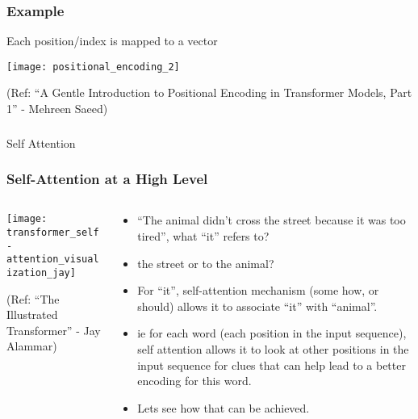 \begin{frame}[fragile]\frametitle{Example}

Each position/index is mapped to a vector

\begin{center}
\texttt{[image: positional\_encoding\_2]}


{\tiny (Ref: ``A Gentle Introduction to Positional Encoding in Transformer Models, Part 1'' - Mehreen Saeed)}
\end{center}		

\end{frame}


\begin{frame}[fragile]\frametitle{}
\begin{center}
{\Large Self Attention}
\end{center}
\end{frame}

\begin{frame}[fragile]\frametitle{Self-Attention at a High Level}

\begin{columns}
    \begin{column}[T]{0.5\linewidth}
\begin{center}
\texttt{[image: transformer\_self-attention\_visualization\_jay]}


{\tiny (Ref: ``The Illustrated Transformer'' - Jay Alammar)}
\end{center}		

		\end{column}
    \begin{column}[T]{0.5\linewidth}

\begin{itemize}
\item ``The animal didn't cross the street because it was too tired'', what ``it'' refers to?
\item  the street or to the animal?
\item For “it”, self-attention mechanism (some how, or should) allows it to associate “it” with “animal”.
\item ie for each word (each position in the input sequence), self attention allows it to look at other positions in the input sequence for clues that can help lead to a better encoding for this word.
\item Lets see how that can be achieved.
\end{itemize}
    \end{column}
  \end{columns}
\end{frame}

